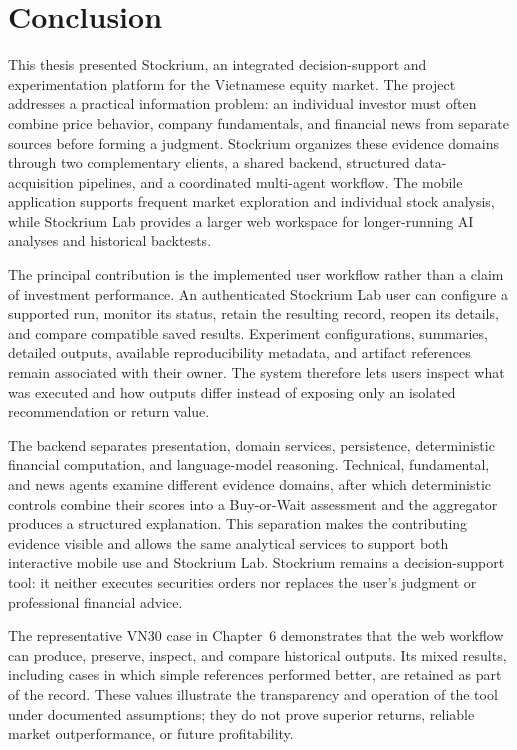 \section{Conclusion}
\label{sec:chapter8-conclusion}

This thesis presented Stockrium, an integrated decision-support and experimentation platform for the Vietnamese equity market. The project addresses a practical information problem: an individual investor must often combine price behavior, company fundamentals, and financial news from separate sources before forming a judgment. Stockrium organizes these evidence domains through two complementary clients, a shared backend, structured data-acquisition pipelines, and a coordinated multi-agent workflow. The mobile application supports frequent market exploration and individual stock analysis, while Stockrium Lab provides a larger web workspace for longer-running AI analyses and historical backtests.

The principal contribution is the implemented user workflow rather than a claim of investment performance. An authenticated Stockrium Lab user can configure a supported run, monitor its status, retain the resulting record, reopen its details, and compare compatible saved results. Experiment configurations, summaries, detailed outputs, available reproducibility metadata, and artifact references remain associated with their owner. The system therefore lets users inspect what was executed and how outputs differ instead of exposing only an isolated recommendation or return value.

The backend separates presentation, domain services, persistence, deterministic financial computation, and language-model reasoning. Technical, fundamental, and news agents examine different evidence domains, after which deterministic controls combine their scores into a Buy-or-Wait assessment and the aggregator produces a structured explanation. This separation makes the contributing evidence visible and allows the same analytical services to support both interactive mobile use and Stockrium Lab. Stockrium remains a decision-support tool: it neither executes securities orders nor replaces the user's judgment or professional financial advice.

The representative VN30 case in Chapter~6 demonstrates that the web workflow can produce, preserve, inspect, and compare historical outputs. Its mixed results, including cases in which simple references performed better, are retained as part of the record. These values illustrate the transparency and operation of the tool under documented assumptions; they do not prove superior returns, reliable market outperformance, or future profitability.

